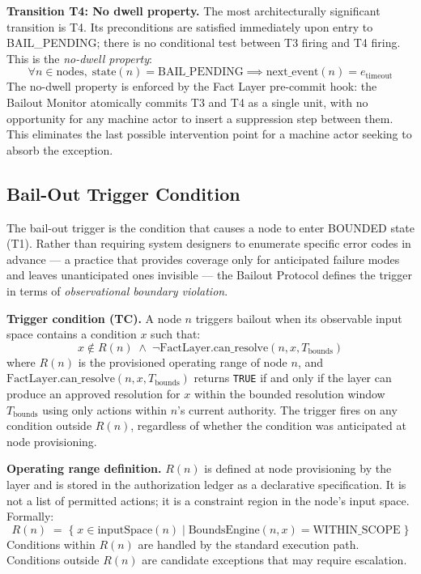 \bigskip
\noindent\textbf{Transition T4: No dwell property.} The most architecturally significant transition is T4. Its preconditions are satisfied immediately upon entry to BAIL\_PENDING; there is no conditional test between T3 firing and T4 firing. This is the \emph{no-dwell property}:
\begin{equation}
\forall n \in \text{nodes},\; \text{state}(n) = \text{BAIL\_PENDING} \implies \text{next\_event}(n) = e_{\text{timeout}} \tag{ND}
\end{equation}
The no-dwell property is enforced by the Fact Layer pre-commit hook: the Bailout Monitor atomically commits T3 and T4 as a single unit, with no opportunity for any machine actor to insert a suppression step between them. This eliminates the last possible intervention point for a machine actor seeking to absorb the exception.

\subsection{Bail-Out Trigger Condition}\label{sec:bailout-trigger}

The bail-out trigger is the condition that causes a node to enter BOUNDED state (T1). Rather than requiring system designers to enumerate specific error codes in advance --- a practice that provides coverage only for anticipated failure modes and leaves unanticipated ones invisible --- the Bailout Protocol defines the trigger in terms of \emph{observational boundary violation}.

\bigskip
\noindent\textbf{Trigger condition (TC).} A node $n$ triggers bailout when its observable input space contains a condition $x$ such that:
\begin{equation}
x \notin R(n) \;\land\; \neg\text{FactLayer.can\_resolve}(n, x, T_{\text{bounds}}) \tag{TC}
\end{equation}
where $R(n)$ is the provisioned operating range of node $n$, and $\text{FactLayer.can\_resolve}(n, x, T_{\text{bounds}})$ returns \texttt{TRUE} if and only if the \fact{} layer can produce an approved resolution for $x$ within the bounded resolution window $T_{\text{bounds}}$ using only actions within $n$'s current authority. The trigger fires on any condition outside $R(n)$, regardless of whether the condition was anticipated at node provisioning.

\bigskip
\noindent\textbf{Operating range definition.} $R(n)$ is defined at node provisioning by the \purpose{} layer and is stored in the authorization ledger as a declarative specification. It is not a list of permitted actions; it is a constraint region in the node's input space. Formally:
\begin{equation}
R(n) \;=\; \{\; x \in \text{inputSpace}(n) \mid \text{BoundsEngine}(n, x) = \text{WITHIN\_SCOPE} \;\} \tag{OR}
\end{equation}
Conditions within $R(n)$ are handled by the standard execution path. Conditions outside $R(n)$ are candidate exceptions that may require escalation.


